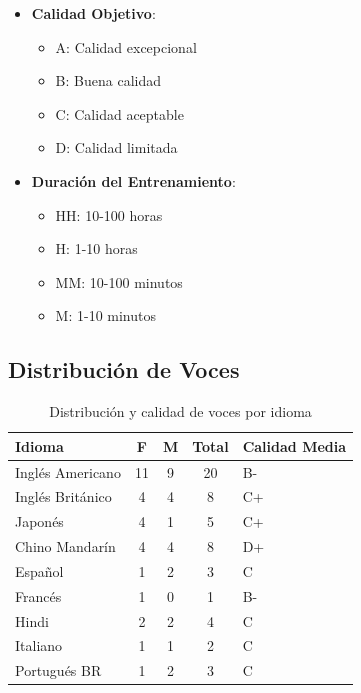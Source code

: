 \begin{itemize}
	\item \textbf{Calidad Objetivo}:
	      \begin{itemize}
		      \item A: Calidad excepcional
		      \item B: Buena calidad
		      \item C: Calidad aceptable
		      \item D: Calidad limitada
	      \end{itemize}

	\item \textbf{Duración del Entrenamiento}:
	      \begin{itemize}
		      \item HH: 10-100 horas
		      \item H: 1-10 horas
		      \item MM: 10-100 minutos
		      \item M: 1-10 minutos
	      \end{itemize}
\end{itemize}

\subsection{Distribución de Voces}
\label{subsec:voice-distribution}

\begin{table}[H]
	\centering
	\caption{Distribución y calidad de voces por idioma}
	\label{tab:voice-distribution}
	\begin{tabular}{|l|c|c|c|l|}
		\hline
		\textbf{Idioma}  & \textbf{F} & \textbf{M} & \textbf{Total} & \textbf{Calidad Media} \\
		\hline
		Inglés Americano & 11         & 9          & 20             & B-                     \\
		\hline
		Inglés Británico & 4          & 4          & 8              & C+                     \\
		\hline
		Japonés          & 4          & 1          & 5              & C+                     \\
		\hline
		Chino Mandarín   & 4          & 4          & 8              & D+                     \\
		\hline
		Español          & 1          & 2          & 3              & C                      \\
		\hline
		Francés          & 1          & 0          & 1              & B-                     \\
		\hline
		Hindi            & 2          & 2          & 4              & C                      \\
		\hline
		Italiano         & 1          & 1          & 2              & C                      \\
		\hline
		Portugués BR     & 1          & 2          & 3              & C                      \\
		\hline
	\end{tabular}
\end{table}

